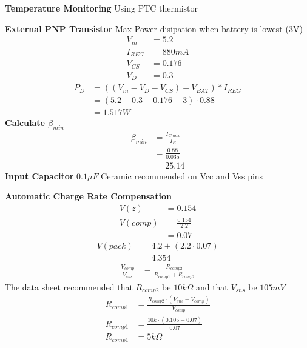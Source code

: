 \documentclass{article}
\numberwithin{figure}{section}
\numberwithin{equation}{section}
\begin{document}
{\textbf{Temperature Monitoring} \newline
Using PTC thermistor

\textbf{External PNP Transistor} \newline
Max Power disipation when battery is lowest (3V)
\begin{align*}
  V_{in} &= 5.2 \\
  I_{REG} &= 880mA \\
  V_{CS} &= 0.176 \\
  V_D &= 0.3
\end{align*}
\begin{align}
  \label{eq:diodepwr}
  P_D &= \left(\left(V_{in} - V_D - V_{CS}\right) - V_{BAT}\right) * I_{REG} \\
  &= \left(5.2 - 0.3 - 0.176 - 3\right) \cdot 0.88 \\
  &= 1.517 W
\end{align}
\textbf{Calculate $\beta_{min}$}
\begin{align}
  \label{eq:betamin}
  \beta_{min} &= \frac{I_{Cmax}}{I_{B}} \\
  &= \frac{0.88}{0.035} \\
  &= 25.14
\end{align}
\textbf{Input Capacitor} \newline
$0.1\mu F$ Ceramic recommended on Vcc and Vss pins

\textbf{Automatic Charge Rate Compensation}
\begin{align}
  \label{eq:comp}
  V(z) &= 0.154 \\
  V(comp) &= \frac{0.154}{2.2} \\
  &= 0.07
\end{align}
\begin{align}
  \label{eq:comp2}
  V(pack) &= 4.2 + (2.2 \cdot 0.07)\\
  &= 4.354
\end{align}
\begin{align}
  \label{eq:comp3}
  \frac{V_{comp}}{V_{sns}} &= \frac{R_{comp2}}{R_{comp1}+R_{comp2}}
\end{align}
The data sheet recommended that $R_{comp2}$ be $10k\Omega$ and that $V_{sns}$ be $105mV$
\begin{align}
  \label{eq:rcomps}
  R_{comp1}&=\frac{R_{comp2} \cdot \left(V_{sns}-V_{comp}\right)}{V_{comp}} \\
  R_{comp1}&=\frac{10k \cdot (0.105 - 0.07)}{0.07} \\
  R_{comp1}&=5k\Omega
\end{align}

}
\end{document}
